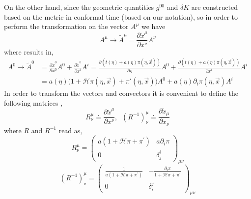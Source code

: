 \documentclass[a4paper,11pt]{article}
\newcommand{\HH}{\mathcal H}
\begin{document}
On the other hand, since the geometric quantities $g^{00}$ and $\delta K$ are constructed based on the metric in conformal time (based on our notation), so in order to perform the transformation on the vector $A^{\mu}$ we have
\begin{equation}
A^{\mu} \rightarrow \tilde{A}^{\mu}=\frac{\partial  \tilde{x}^{\mu}}{\partial   x^{\nu}} A^{\nu}
\end{equation}
where results in,
\begin{align}
A^{0} \rightarrow \tilde{A}^{0}& =\frac{\partial  \tilde{x}^{0}}{\partial   x^{0}} A^{0}  + \frac{\partial  \tilde{x}^{0}}{\partial   x^{i}} A^{i} = \frac{\partial  (t(\eta) + a(\eta) \pi (\eta, \vec x))}{\partial   \eta} A^0 +  \frac{\partial  (t(\eta) + a(\eta) \pi (\eta, \vec x))}{\partial   x^i} A^i \\ \nonumber &=a(\eta) \big( 1 + \HH \pi(\eta,\vec x) + \pi'(\eta, \vec x) \Big) A^0 + a(\eta) \partial_i \pi(\eta, \vec x) A^i
\end{align}
In order to transform the vectors and convectors it is convenient to define the following matrices  \cite{Lewandowski:2016yce},
\begin{equation}
R_{\nu}^{\mu} \doteq \frac{\partial \tilde{x}^{\mu}}{\partial x^{\nu}}, \; \; (R^{-1})_{\nu}^{\mu} \doteq \frac{\partial \tilde{x}_{\mu}}{\partial x_{\nu}}
\end{equation}
where $R$ and $R^{-1}$ read as,
\begin{equation}
R_{\nu}^{\mu}=\left(\begin{array}{cc}
a(1+\HH \pi+\pi^{\prime}) & a \partial_{i} \pi \\
0 & \delta_{j}^{i}
\end{array}\right)_{\mu \nu}
\end{equation}
\begin{equation}
(R^{-1})_{\nu}^{\mu} =
\left(\begin{array}{cc}
  \frac{1}{a(1+\HH \pi+\pi^{\prime})} & - \frac{ \partial_{i} \pi}{1+ \HH \pi+\pi^{\prime}} \\
0 & \delta_{i}^{j}
\end{array}\right)_{\mu \nu}
\end{equation}
\end{document}
